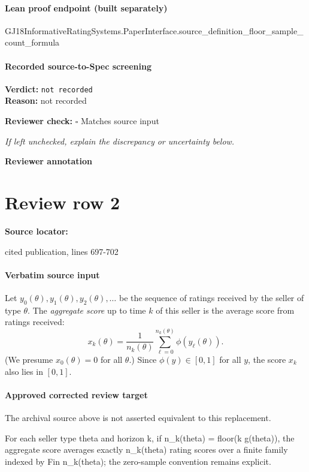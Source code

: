 \documentclass[10pt]{article}
\newcommand{\reviewerbox}{%
  \par\noindent\fbox{\parbox{0.96\linewidth}{\rule{0pt}{0.38in}}}\par
}
\newcommand{\reviewmatch}[1]{%
  \par\noindent\textbf{Reviewer check:} $\square$\; #1\par
  \noindent\emph{If left unchecked, explain the discrepancy or uncertainty below.}\par
}
\begin{document}
\paragraph{Lean proof endpoint (built separately)}\begin{ReviewVerbatim}
GJ18InformativeRatingSystems.PaperInterface.source_definition_floor_sample_count_formula
\end{ReviewVerbatim}

\paragraph{Recorded source-to-Spec screening}
\textbf{Verdict:} \texttt{not recorded}
\\
\textbf{Reason:} not recorded
\reviewmatch{Matches source input}
\noindent\textbf{Reviewer annotation}\par
\reviewerbox
\clearpage
\hypertarget{source-claim-038938d2e8c6aaa5}{}
\section*{Review row 2}
\textbf{Source locator:} {\footnotesize\raggedright cited publication, lines 697-\allowbreak{}702\par}
\paragraph{Verbatim source input}
\begin{ReviewVerbatim}
Let $y_0(\theta), y_1(\theta), y_2(\theta), \ldots$ be the sequence of ratings received by the seller of type $\theta$.  The {\em aggregate score} up to time $k$ of this seller is the average score from ratings received:
\begin{equation}
\label{eq:aggscore}
 x_k(\theta) =  \frac{1}{n_k(\theta)} \sum_{\ell = 0}^{n_k(\theta)} \phi(y_\ell(\theta)).
\end{equation}
(We presume $x_0(\theta) = 0$ for all $\theta$.)  Since $\phi(y) \in [0,1]$ for all $y$, the score $x_k$ also lies in $[0,1]$.
\end{ReviewVerbatim}

\paragraph{Approved corrected review target}
The archival source above is not asserted equivalent to this replacement.
\begin{ReviewVerbatim}
For each seller type theta and horizon k, if n_k(theta) = floor(k g(theta)), the aggregate score averages exactly n_k(theta) rating scores over a finite family indexed by Fin n_k(theta); the zero-sample convention remains explicit.
\end{ReviewVerbatim}
\end{document}
